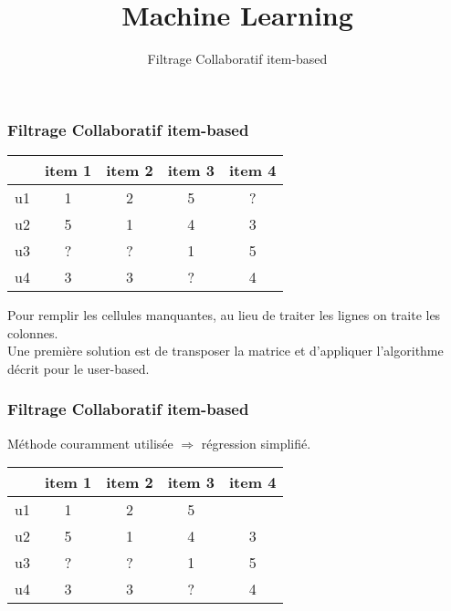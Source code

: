 \documentclass{formation}
\title{Machine Learning}
\subtitle{Filtrage Collaboratif item-based}
\begin{document}
\maketitle

\begin{frame}
  \frametitle{Filtrage Collaboratif item-based}
  \begin{center}
    \begin{tabular}{|l|c|c|c|c|}
      \hline
      & item 1 & item 2 & item 3 & item 4 \\
      \hline
      u1 & 1 & 2 & 5 & ? \\
      \hline
      u2 & 5 & 1 & 4 & 3 \\
      \hline
      u3 & ? & ? & 1 & 5 \\
      \hline
      u4 & 3 & 3 & ? & 4 \\
      \hline
    \end{tabular}
  \end{center}
  Pour remplir les cellules manquantes, au lieu de traiter les lignes on traite les colonnes. \\
  Une première solution est de transposer la matrice et d'appliquer l'algorithme décrit pour le user-based.
\end{frame}

\begin{frame}
  \frametitle{Filtrage Collaboratif item-based}
  Méthode couramment utilisée $\Rightarrow$ régression simplifié. \\
  \begin{center}
    \begin{tabular}{|l|c|c|c|c|}
      \hline
      & item 1 & item 2 & item 3 & item 4 \\
      \hline
      u1 & 1 & 2 & 5 & \red{?} \\
      \hline
      u2 & 5 & 1 & 4 & 3 \\
      \hline
      u3 & ? & ? & 1 & 5 \\
      \hline
      u4 & 3 & 3 & ? & 4 \\
      \hline
    \end{tabular}
  \end{center}
\end{frame}
\end{document}
